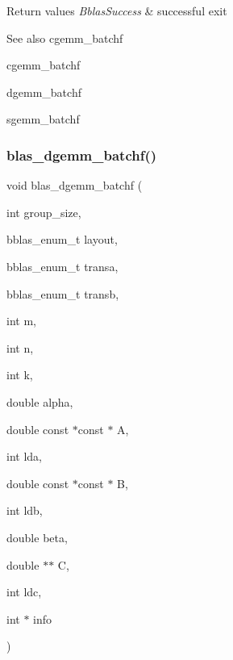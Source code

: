 \begin{DoxyRetVals}{Return values}
{\em Bblas\+Success} & successful exit\\
\hline
\end{DoxyRetVals}
\begin{DoxySeeAlso}{See also}
cgemm\+\_\+batchf 

cgemm\+\_\+batchf 

dgemm\+\_\+batchf 

sgemm\+\_\+batchf 
\end{DoxySeeAlso}
\mbox{\label{group__gemm__batchf_gaa3c403cc8465c276b39d139275e5c0bd}} 
\subsubsection{\texorpdfstring{blas\+\_\+dgemm\+\_\+batchf()}{blas\_dgemm\_batchf()}}
{\footnotesize\ttfamily void blas\+\_\+dgemm\+\_\+batchf (\begin{DoxyParamCaption}\item[{int}]{group\+\_\+size,  }\item[{bblas\+\_\+enum\+\_\+t}]{layout,  }\item[{bblas\+\_\+enum\+\_\+t}]{transa,  }\item[{bblas\+\_\+enum\+\_\+t}]{transb,  }\item[{int}]{m,  }\item[{int}]{n,  }\item[{int}]{k,  }\item[{double}]{alpha,  }\item[{double const $\ast$const $\ast$}]{A,  }\item[{int}]{lda,  }\item[{double const $\ast$const $\ast$}]{B,  }\item[{int}]{ldb,  }\item[{double}]{beta,  }\item[{double $\ast$$\ast$}]{C,  }\item[{int}]{ldc,  }\item[{int $\ast$}]{info }\end{DoxyParamCaption})}

